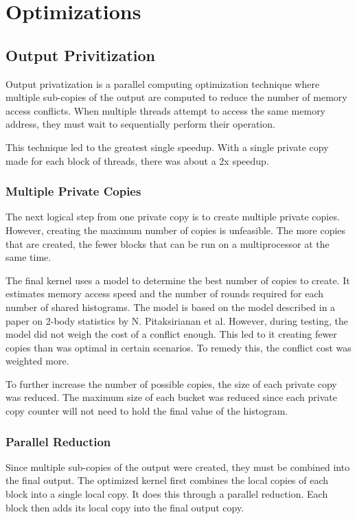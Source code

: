 \section{Optimizations}
\subsection{Output Privitization}
\hspace{\parindent}Output privatization is a parallel computing optimization technique where multiple sub-copies of the output are computed to reduce the number of memory access conflicts. When multiple threads attempt to access the same memory address, they must wait to sequentially perform their operation. 

This technique led to the greatest single speedup. With a single private copy made for each block of threads, there was about a 2x speedup.
 
\subsubsection{Multiple Private Copies}
\hspace{\parindent}The next logical step from one private copy is to create multiple private copies. However, creating the maximum number of copies is unfeasible. The more copies that are created, the fewer blocks that can be run on a multiprocessor at the same time. 

The final kernel uses a model to determine the best number of copies to create. It estimates memory access speed and the number of rounds required for each number of shared histograms. The model is based on the model described in a paper on 2-body statistics by N. Pitaksirianan et al. However, during testing, the model did not weigh the cost of a conflict enough. This led to it creating fewer copies than was optimal in certain scenarios. To remedy this, the conflict cost was weighted more.

To further increase the number of possible copies, the size of each private copy was reduced. The maximum size of each bucket was reduced since each private copy counter will not need to hold the final value of the histogram.
\subsubsection{Parallel Reduction}
\hspace{\parindent}Since multiple sub-copies of the output were created, they must be combined into the final output. The optimized kernel first combines the local copies of each block into a single local copy. It does this through a parallel reduction. Each block then adds its local copy into the final output copy.

